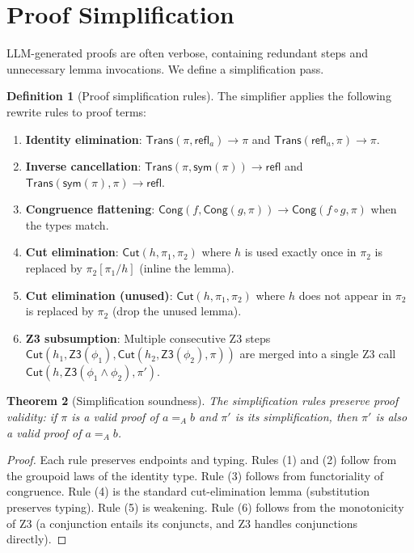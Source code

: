 \documentclass[11pt,a4paper]{report}
\theoremstyle{definition}
\newtheorem{definition}{Definition}[chapter]
\theoremstyle{plain}
\newtheorem{theorem}[definition]{Theorem}
\newcommand{\Refl}{\mathsf{refl}}
\newcommand{\sym}{\mathsf{sym}}
\newcommand{\Cut}{\mathsf{Cut}}
\newcommand{\Trans}{\mathsf{Trans}}
\newcommand{\Cong}{\mathsf{Cong}}
\begin{document}
\section{Proof Simplification}

LLM-generated proofs are often verbose, containing redundant steps and
unnecessary lemma invocations.  We define a simplification pass.

\begin{definition}[Proof simplification rules]
\label{def:proof-simplify}
The simplifier applies the following rewrite rules to proof terms:
\begin{enumerate}
  \item \textbf{Identity elimination}: $\Trans(\pi, \Refl_a) \to \pi$ and
    $\Trans(\Refl_a, \pi) \to \pi$.
  \item \textbf{Inverse cancellation}: $\Trans(\pi, \sym(\pi)) \to \Refl$
    and $\Trans(\sym(\pi), \pi) \to \Refl$.
  \item \textbf{Congruence flattening}: $\Cong(f, \Cong(g, \pi)) \to
    \Cong(f \circ g, \pi)$ when the types match.
  \item \textbf{Cut elimination}: $\Cut(h, \pi_1, \pi_2)$ where $h$ is used
    exactly once in $\pi_2$ is replaced by $\pi_2[\pi_1/h]$ (inline the lemma).
  \item \textbf{Cut elimination (unused)}: $\Cut(h, \pi_1, \pi_2)$ where $h$
    does not appear in $\pi_2$ is replaced by $\pi_2$ (drop the unused lemma).
  \item \textbf{Z3 subsumption}: Multiple consecutive Z3 steps
    $\Cut(h_1, \mathsf{Z3}(\phi_1), \Cut(h_2, \mathsf{Z3}(\phi_2), \pi))$
    are merged into a single Z3 call $\Cut(h, \mathsf{Z3}(\phi_1 \wedge \phi_2), \pi')$.
\end{enumerate}
\end{definition}

\begin{theorem}[Simplification soundness]
The simplification rules preserve proof validity: if $\pi$ is a valid proof
of $a =_A b$ and $\pi'$ is its simplification, then $\pi'$ is also a valid
proof of $a =_A b$.
\end{theorem}
\begin{proof}
Each rule preserves endpoints and typing.  Rules (1) and (2) follow from the
groupoid laws of the identity type.  Rule (3) follows from functoriality of
congruence.  Rule (4) is the standard cut-elimination lemma (substitution
preserves typing).  Rule (5) is weakening.  Rule (6) follows from the
monotonicity of Z3 (a conjunction entails its conjuncts, and Z3 handles
conjunctions directly).
\end{proof}
\end{document}
